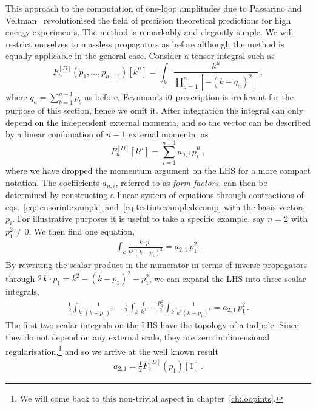 This approach to the computation of one-loop amplitudes due to Passarino and
Veltman~\cite{ch3_Passarino:1978jh} revolutionised the field of precision theoretical predictions for high
energy experiments. The method is remarkably and elegantly simple. We will
restrict ourselves to massless propagators as before although the method is
equally applicable in the general case. Consider a tensor integral such as
\begin{equation}
  F_n^{[D]}(p_1,\ldots,p_{n-1})[k^\mu] = \int_k \frac{k^\mu}{\prod_{a=1}^{n}[-(k-q_a)^2]} \,,
  \label{eq:tensorintexample}
\end{equation}
where $q_{a} = \sum_{b=1}^{a-1} p_b$ as before. Feynman's $\mathrm{i} 0$ prescription is irrelevant for the purpose of this section, hence we omit it. After integration the
integral can only depend on the independent external momenta, and so the vector can be described by a linear combination of $n-1$ external
momenta, as
\begin{equation}
  F^{[D]}_{n}[k^\mu] = \sum_{i=1}^{n-1} a_{n,i} \, p_i^\mu \,,
  \label{eq:testintexampledecomp}
\end{equation}
where we have dropped the momentum argument on the LHS for a more
compact notation. The coefficients $a_{n,i}$, referred to as \emph{form factors}, can then be determined by
constructing a linear system of equations through contractions of eqs.~\eqref{eq:tensorintexample} and~\eqref{eq:testintexampledecomp} with the basis
vectors $p_i$. For illustrative purposes it is useful to take a specific
example, say $n=2$ with $p_1^2\neq 0$. We then find one equation,
\begin{align}
  \int_k \frac{k\cdot p_1}{k^2 (k-p_1)^2} = a_{2,1} \, p_1^2 \,.
\end{align}
By rewriting the scalar product in the numerator in terms of inverse propagators through
 $2 \, k\cdot p_1 = k^2 - (k-p_1)^2 + p_1^2$, we can expand the LHS into three scalar integrals,
\begin{align}
  \frac{1}{2} \int_k \frac{1}{(k-p_1)^2}  - \frac{1}{2} \int_k \frac{1}{k^2} + \frac{p_1^2}{2} \int_k \frac{1}{k^2 (k-p_1)^2} = a_{2,1} \, p_1^2 \,.
\end{align}
The first two scalar integrals on the LHS have the topology of a tadpole. Since they do not depend on any external scale, they are zero in dimensional regularisation,\footnote{We will come back to this non-trivial aspect in chapter~\ref{ch:loopints}.} and so we arrive at the well known result
\begin{align}
  a_{2,1} = \frac{1}{2} F^{[D]}_2(p_1)[1] \,.
  \label{eq:PVbubR1sol}
\end{align}
